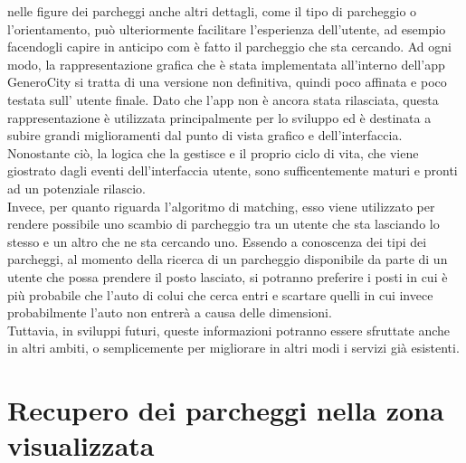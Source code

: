 nelle figure dei parcheggi anche altri dettagli, come il tipo di parcheggio o 
l'orientamento, può ulteriormente facilitare l'esperienza dell'utente, ad esempio
facendogli capire in anticipo com è fatto il parcheggio che sta cercando.
Ad ogni modo, la rappresentazione grafica che è stata implementata all'interno
dell'app GeneroCity si tratta di una versione non definitiva, quindi poco affinata e poco
testata sull' utente finale. Dato che l'app non è ancora stata rilasciata, questa 
rappresentazione è utilizzata principalmente per lo sviluppo ed è destinata a subire
grandi miglioramenti dal punto di vista grafico e dell'interfaccia. Nonostante ciò,
la logica che la gestisce e il proprio ciclo di vita, che viene giostrato dagli eventi
dell'interfaccia utente, sono sufficentemente maturi e pronti ad un potenziale rilascio.\\
Invece, per quanto riguarda l'algoritmo di matching, esso viene utilizzato per 
rendere possibile uno scambio di parcheggio tra un utente che sta lasciando lo 
stesso e un altro che ne sta cercando uno. Essendo a conoscenza dei tipi dei 
parcheggi, al momento della ricerca di un parcheggio disponibile da parte di un
utente che possa prendere il posto lasciato, si potranno preferire i posti in cui
è più probabile che l'auto di colui che cerca entri e scartare quelli in cui invece
probabilmente l'auto non entrerà a causa delle dimensioni.\\
Tuttavia, in sviluppi futuri, queste informazioni potranno essere sfruttate anche in
altri ambiti, o semplicemente per migliorare in altri modi i servizi già esistenti.


\section{Recupero dei parcheggi nella zona visualizzata} 


